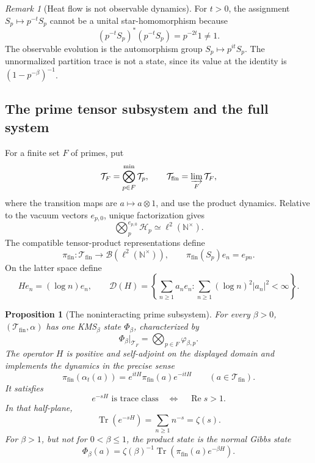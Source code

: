 \documentclass[11pt]{article}
\theoremstyle{plain}
\newtheorem{proposition}[theorem]{Proposition}
\theoremstyle{definition}
\theoremstyle{remark}
\newtheorem{remark}[theorem]{Remark}
\begin{document}
\begin{remark}[Heat flow is not observable dynamics]
For \(t>0\), the assignment \(S_p\mapsto p^{-t}S_p\) cannot be a unital
star-homomorphism because
\[
 (p^{-t}S_p)^*(p^{-t}S_p)=p^{-2t}1\ne1.
\]
The observable evolution is the automorphism group
\(S_p\mapsto p^{it}S_p\).  The unnormalized partition trace is not a
state, since its value at the identity is \((1-p^{-\beta})^{-1}\).
\end{remark}

\subsection{The prime tensor subsystem and the full system}

For a finite set \(F\) of primes, put
\[
 \mathcal T_F=\bigotimes_{p\in F}^{\min}\mathcal T_p,
 \qquad
 \mathcal T_{\mathrm{fin}}=\varinjlim_F\mathcal T_F,
\]
where the transition maps are \(a\mapsto a\otimes1\), and use the product
dynamics.  Relative to the vacuum vectors \(e_{p,0}\), unique
factorization gives
\[
 \bigotimes_p^{e_{p,0}}\mathscr H_p\simeq\ell^2(\mathbb N^\times).
\]
The compatible tensor-product representations define
\[
 \pi_{\mathrm{fin}}:\mathcal T_{\mathrm{fin}}
 \longrightarrow\mathcal B(\ell^2(\mathbb N^\times)),
 \qquad \pi_{\mathrm{fin}}(S_p)e_n=e_{pn}.
\]
On the latter space define
\[
 He_n=(\log n)e_n,\qquad
 \mathcal D(H)=
 \left\{\sum_{n\geq1}a_ne_n:
 \sum_{n\geq1}(\log n)^2|a_n|^2<\infty\right\}.
\]

\begin{proposition}[The noninteracting prime subsystem]
\label{prop:prime-product}
For every \(\beta>0\), \((\mathcal T_{\mathrm{fin}},\alpha)\) has one
KMS\(_\beta\) state \(\Phi_\beta\), characterized by
\[
 \Phi_\beta|_{\mathcal T_F}
 =\bigotimes_{p\in F}\varphi_{\beta,p}.
\]
The operator \(H\) is positive and self-adjoint on the displayed domain and
implements the dynamics in the precise sense
\[
 \pi_{\mathrm{fin}}(\alpha_t(a))
 =e^{itH}\pi_{\mathrm{fin}}(a)e^{-itH}
 \qquad(a\in\mathcal T_{\mathrm{fin}}).
\]
It satisfies
\[
 e^{-sH}\text{ is trace class}
 \quad\Longleftrightarrow\quad \operatorname{Re}s>1.
\]
In that half-plane,
\[
 \operatorname{Tr}(e^{-sH})=\sum_{n\geq1}n^{-s}=\zeta(s).
\]
For \(\beta>1\), but not for \(0<\beta\leq1\), the product state is the
normal Gibbs state
\[
 \Phi_\beta(a)=\zeta(\beta)^{-1}
 \operatorname{Tr}(\pi_{\mathrm{fin}}(a)e^{-\beta H}).
\]
\end{proposition}
\end{document}
